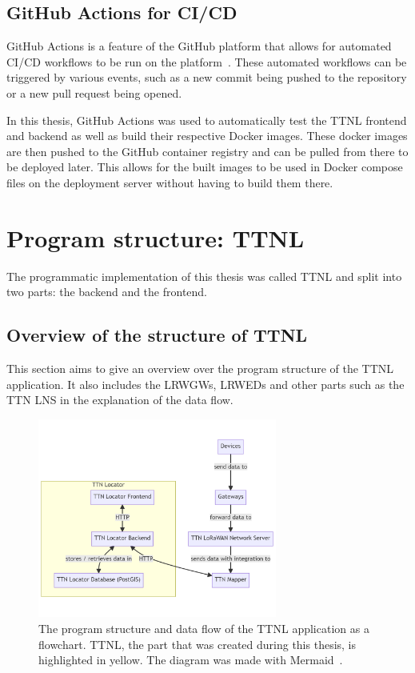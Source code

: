 \subsection{GitHub Actions for \acl{CI/CD}}

GitHub Actions is a feature of the GitHub platform that allows for automated \ac{CI/CD} workflows to be run on the platform~\cite{github_inc_features_2023}.
These automated workflows can be triggered by various events, such as a new commit being pushed to the repository or a new pull request being opened.

In this thesis, GitHub Actions was used to automatically test the \ac{TTNL} frontend and backend as well as build their respective Docker images.
These docker images are then pushed to the GitHub container registry and can be pulled from there to be deployed later.
This allows for the built images to be used in Docker compose files on the deployment server without having to build them there.

\section{Program structure: \acl{TTNL}}\label{section:ttnl}

The programmatic implementation of this thesis was called \acf{TTNL} and split into two parts: the backend and the frontend.

\subsection{Overview of the structure of \acl{TTNL}}

This section aims to give an overview over the program structure of the \ac{TTNL} application.
It also includes the \aclp{LRWGW}, \aclp{LRWED} and other parts such as the \ac{TTN} \ac{LNS} in the explanation of the data flow.

\begin{figure}[htbp]
    \centering
    \includegraphics[width=0.7\textwidth]{pictures/ttn-locator/program_structure.png}
    \caption[Program structure and data flow of the \acl{TTNL} application]{
        The program structure and data flow of the \ac{TTNL} application as a flowchart.
        \ac{TTNL}, the part that was created during this thesis, is highlighted in yellow.
        The diagram was made with Mermaid~\cite{mermaid_mermaid_2023}.
    }\label{pic:program-structure}
\end{figure}

